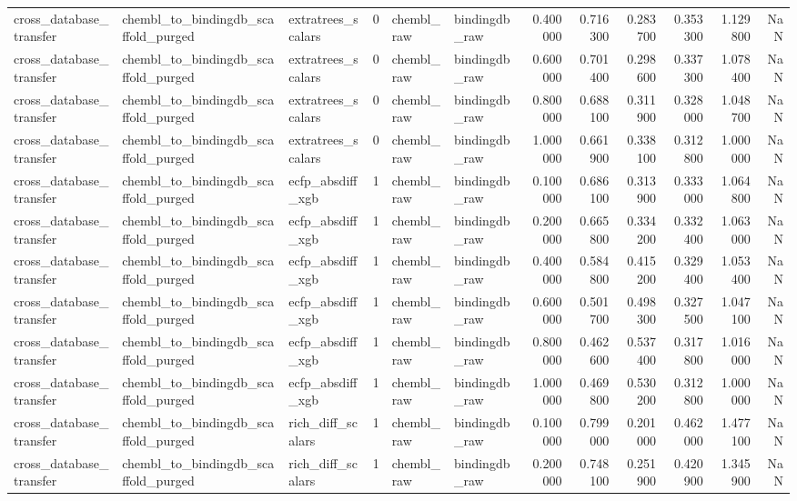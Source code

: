 \begin{longtable}{lllrllrrrrrr}
cross\_database\_transfer & chembl\_to\_bindingdb\_scaffold\_purged & extratrees\_scalars & 0 & chembl\_raw & bindingdb\_raw & 0.400000 & 0.716300 & 0.283700 & 0.353300 & 1.129800 & NaN \\
cross\_database\_transfer & chembl\_to\_bindingdb\_scaffold\_purged & extratrees\_scalars & 0 & chembl\_raw & bindingdb\_raw & 0.600000 & 0.701400 & 0.298600 & 0.337300 & 1.078400 & NaN \\
cross\_database\_transfer & chembl\_to\_bindingdb\_scaffold\_purged & extratrees\_scalars & 0 & chembl\_raw & bindingdb\_raw & 0.800000 & 0.688100 & 0.311900 & 0.328000 & 1.048700 & NaN \\
cross\_database\_transfer & chembl\_to\_bindingdb\_scaffold\_purged & extratrees\_scalars & 0 & chembl\_raw & bindingdb\_raw & 1.000000 & 0.661900 & 0.338100 & 0.312800 & 1.000000 & NaN \\
cross\_database\_transfer & chembl\_to\_bindingdb\_scaffold\_purged & ecfp\_absdiff\_xgb & 1 & chembl\_raw & bindingdb\_raw & 0.100000 & 0.686100 & 0.313900 & 0.333000 & 1.064800 & NaN \\
cross\_database\_transfer & chembl\_to\_bindingdb\_scaffold\_purged & ecfp\_absdiff\_xgb & 1 & chembl\_raw & bindingdb\_raw & 0.200000 & 0.665800 & 0.334200 & 0.332400 & 1.063000 & NaN \\
cross\_database\_transfer & chembl\_to\_bindingdb\_scaffold\_purged & ecfp\_absdiff\_xgb & 1 & chembl\_raw & bindingdb\_raw & 0.400000 & 0.584800 & 0.415200 & 0.329400 & 1.053400 & NaN \\
cross\_database\_transfer & chembl\_to\_bindingdb\_scaffold\_purged & ecfp\_absdiff\_xgb & 1 & chembl\_raw & bindingdb\_raw & 0.600000 & 0.501700 & 0.498300 & 0.327500 & 1.047100 & NaN \\
cross\_database\_transfer & chembl\_to\_bindingdb\_scaffold\_purged & ecfp\_absdiff\_xgb & 1 & chembl\_raw & bindingdb\_raw & 0.800000 & 0.462600 & 0.537400 & 0.317800 & 1.016000 & NaN \\
cross\_database\_transfer & chembl\_to\_bindingdb\_scaffold\_purged & ecfp\_absdiff\_xgb & 1 & chembl\_raw & bindingdb\_raw & 1.000000 & 0.469800 & 0.530200 & 0.312800 & 1.000000 & NaN \\
cross\_database\_transfer & chembl\_to\_bindingdb\_scaffold\_purged & rich\_diff\_scalars & 1 & chembl\_raw & bindingdb\_raw & 0.100000 & 0.799000 & 0.201000 & 0.462000 & 1.477100 & NaN \\
cross\_database\_transfer & chembl\_to\_bindingdb\_scaffold\_purged & rich\_diff\_scalars & 1 & chembl\_raw & bindingdb\_raw & 0.200000 & 0.748100 & 0.251900 & 0.420900 & 1.345900 & NaN \\

\end{longtable}

